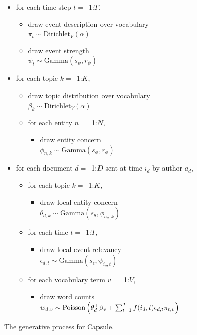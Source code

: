 \begin{figure}
\begin{mdframed}
\small
\begin{itemize}[leftmargin=*]
\item for each time step $t=$~1:$T$,
	\begin{itemize}[leftmargin=*]
	\item draw event description over vocabulary \\$\pi_t \sim \mbox{Dirichlet}_V (\alpha)$
	\item draw event strength \\$\psi_{t} \sim \mbox{Gamma}(s_\psi, r_\psi)$
	\end{itemize}
\item for each topic $k=$~1:$K$,
	\begin{itemize}[leftmargin=*]
	\item draw topic distribution over vocabulary \\$\beta_k \sim \mbox{Dirichlet}_V (\alpha)$
	\item for each entity $n=$~1:$N$,
		\begin{itemize}[leftmargin=*]
		\item draw entity concern \\$\phi_{n,k} \sim \mbox{Gamma}(s_\phi, r_\phi)$
		\end{itemize}
	\end{itemize}
\item for each document $d=$~1:$D$ sent at time $i_d$ by author $a_d$,
	\begin{itemize}[leftmargin=*]
		\item for each topic $k=$~1:$K$,
		\begin{itemize}[leftmargin=*]
			\item draw local entity concern \\$\theta_{d,k} \sim \mbox{Gamma}(s_\theta, \phi_{a_d,k})$
		\end{itemize}
	\item for each time $t=$~1:$T$,
		\begin{itemize}[leftmargin=*]
			\item draw local event relevancy \\$\epsilon_{d,t} \sim \mbox{Gamma}(s_\epsilon, \psi_{i_d,t})$ 
		\end{itemize}
	\item for each vocabulary term $v=$~1:$V$,
		\begin{itemize}[leftmargin=*]
			\item draw word counts $w_{d,v} \sim\\ \mbox{Poisson}\left(\theta_d^\top\beta_v + \sum_{t=1}^T f(i_d, t) \epsilon_{d,t} \pi_{t,v}\right)$
		\end{itemize}
	\end{itemize}
\end{itemize}
\end{mdframed}
\caption{The generative process for Capsule.}
\label{fig:generative-model}
\end{figure}


